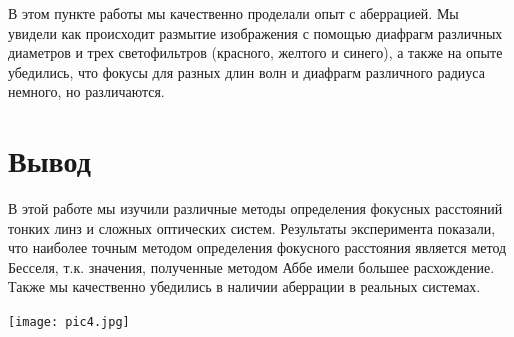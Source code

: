 \documentclass[a4paper,12pt]{report}
\begin{document}
В этом пункте работы мы качественно проделали опыт с аберрацией. Мы увидели как происходит размытие изображения с помощью диафрагм различных диаметров и трех светофильтров (красного, желтого и синего), а также на опыте убедились, что фокусы для разных длин волн и диафрагм различного радиуса немного, но различаются.

\section*{Вывод}

В этой работе мы изучили различные методы определения фокусных расстояний тонких линз и сложных оптических систем. Результаты эксперимента показали, что наиболее точным методом определения фокусного расстояния является метод Бесселя, т.к. значения, полученные методом Аббе имели большее расхождение. Также мы качественно убедились в наличии аберрации в реальных системах.

\begin{center}
    \texttt{[image: pic4.jpg]}
\end{center}
\end{document}
